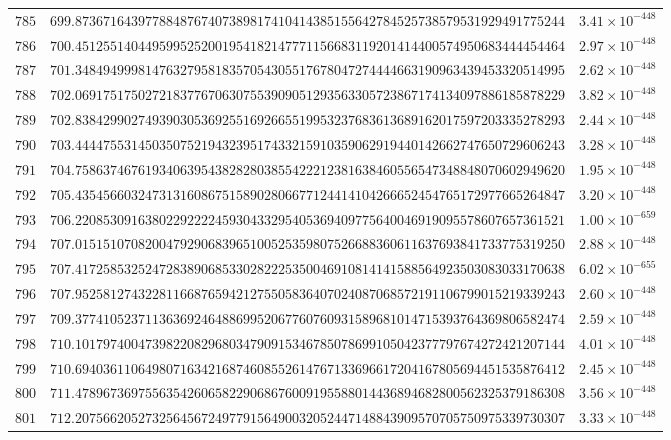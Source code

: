 \documentclass[12pt,reqno]{amsart}
\theoremstyle{remark}
\begin{document}
\begin{longtable}{clc}
$785$ & $699.8736716439778848767407389817410414385155642784525738579531929491775244$ & $3.41\times 10^{-448}$ \\
$786$ & $700.4512551404495995252001954182147771156683119201414400574950683444454464$ & $2.97\times 10^{-448}$ \\
$787$ & $701.3484949998147632795818357054305517678047274444663190963439453320514995$ & $2.62\times 10^{-448}$ \\
$788$ & $702.0691751750272183776706307553909051293563305723867174134097886185878229$ & $3.82\times 10^{-448}$ \\
$789$ & $702.8384299027493903053692551692665519953237683613689162017597203335278293$ & $2.44\times 10^{-448}$ \\
$790$ & $703.4444755314503507521943239517433215910359062919440142662747650729606243$ & $3.28\times 10^{-448}$ \\
$791$ & $704.7586374676193406395438282803855422212381638460556547348848070602949620$ & $1.95\times 10^{-448}$ \\
$792$ & $705.4354566032473131608675158902806677124414104266652454765172977665264847$ & $3.20\times 10^{-448}$ \\
$793$ & $706.2208530916380229222245930433295405369409775640046919095578607657361521$ & $1.00\times 10^{-659}$ \\
$794$ & $707.0151510708200479290683965100525359807526688360611637693841733775319250$ & $2.88\times 10^{-448}$ \\
$795$ & $707.4172585325247283890685330282225350046910814141588564923503083033170638$ & $6.02\times 10^{-655}$ \\
$796$ & $707.9525812743228116687659421275505836407024087068572191106799015219339243$ & $2.60\times 10^{-448}$ \\
$797$ & $709.3774105237113636924648869952067760760931589681014715393764369806582474$ & $2.59\times 10^{-448}$ \\
$798$ & $710.1017974004739822082968034790915346785078699105042377797674272421207144$ & $4.01\times 10^{-448}$ \\
$799$ & $710.6940361106498071634216874608552614767133696617204167805694451535876412$ & $2.45\times 10^{-448}$ \\
$800$ & $711.4789673697556354260658229068676009195588014436894682800562325379186308$ & $3.56\times 10^{-448}$ \\
$801$ & $712.2075662052732564567249779156490032052447148843909570705750975339730307$ & $3.33\times 10^{-448}$ \\

\end{longtable}
\end{document}
